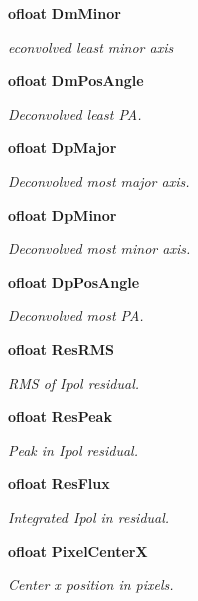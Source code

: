 \begin{CompactItemize}
{\bf ofloat} {\bf Dm\-Minor}
\begin{CompactList}\small\item\em econvolved least minor axis \item\end{CompactList}\item 
{\bf ofloat} {\bf Dm\-Pos\-Angle}
\begin{CompactList}\small\item\em Deconvolved least PA. \item\end{CompactList}\item 
{\bf ofloat} {\bf Dp\-Major}
\begin{CompactList}\small\item\em Deconvolved most major axis. \item\end{CompactList}\item 
{\bf ofloat} {\bf Dp\-Minor}
\begin{CompactList}\small\item\em Deconvolved most minor axis. \item\end{CompactList}\item 
{\bf ofloat} {\bf Dp\-Pos\-Angle}
\begin{CompactList}\small\item\em Deconvolved most PA. \item\end{CompactList}\item 
{\bf ofloat} {\bf Res\-RMS}
\begin{CompactList}\small\item\em RMS of Ipol residual. \item\end{CompactList}\item 
{\bf ofloat} {\bf Res\-Peak}
\begin{CompactList}\small\item\em Peak in Ipol residual. \item\end{CompactList}\item 
{\bf ofloat} {\bf Res\-Flux}
\begin{CompactList}\small\item\em Integrated Ipol in residual. \item\end{CompactList}\item 
{\bf ofloat} {\bf Pixel\-Center\-X}
\begin{CompactList}\small\item\em Center x position in pixels. \item\end{CompactList}\item 

\end{CompactItemize}
